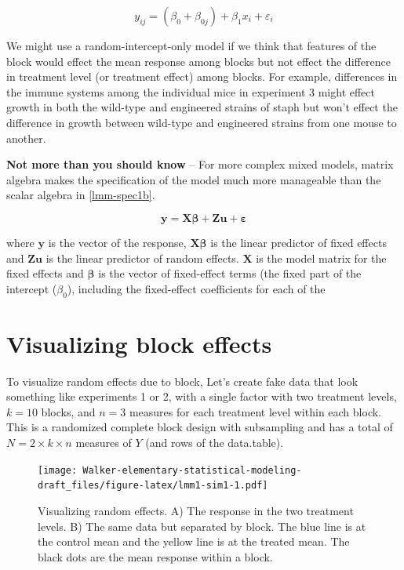 \documentclass[]{book}
\begin{document}
\begin{equation}
y_{ij} = (\beta_{0} + \beta_{0j}) + \beta_{1}x_i + \varepsilon_i 
\label{eq:lmm-spec1b}
\end{equation}

We might use a random-intercept-only model if we think that features of
the block would effect the mean response among blocks but not effect the
difference in treatment level (or treatment effect) among blocks. For
example, differences in the immune systems among the individual mice in
experiment 3 might effect growth in both the wild-type and engineered
strains of staph but won't effect the difference in growth between
wild-type and engineered strains from one mouse to another.

\textbf{Not more than you should know} -- For more complex mixed models,
matrix algebra makes the specification of the model much more manageable
than the scalar algebra in \ref{lmm-spec1b}.

\begin{equation}
\mathbf{y} = \mathbf{X}\boldsymbol{\beta} + \mathbf{Zu} + \boldsymbol{\varepsilon}
\end{equation}

where \(\mathbf{y}\) is the vector of the response,
\(\mathbf{X}\boldsymbol{\beta}\) is the linear predictor of fixed
effects and \(\mathbf{Zu}\) is the linear predictor of random effects.
\(\mathbf{X}\) is the model matrix for the fixed effects and
\(\boldsymbol{\beta}\) is the vector of fixed-effect terms (the fixed
part of the intercept (\(\beta_0\)), including the fixed-effect
coefficients for each of the

\section{Visualizing block effects}\label{visualizing-block-effects}

To visualize random effects due to block, Let's create fake data that
look something like experiments 1 or 2, with a single factor with two
treatment levels, \(k=10\) blocks, and \(n=3\) measures for each
treatment level within each block. This is a randomized complete block
design with subsampling and has a total of \(N=2 \times k \times n\)
measures of \(Y\) (and rows of the data.table).

\begin{figure}
\centering
\texttt{[image: Walker-elementary-statistical-modeling-draft\_files/figure-latex/lmm1-sim1-1.pdf]}
\caption{\label{fig:lmm1-sim1}Visualizing random effects. A) The response in
the two treatment levels. B) The same data but separated by block. The
blue line is at the control mean and the yellow line is at the treated
mean. The black dots are the mean response within a block.}
\end{figure}
\end{document}
